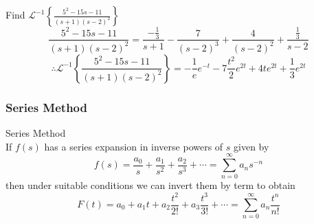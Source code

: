 \documentclass[12pt]{article}
\newcommand{\Lapinv}{\mathscr{L}^{-1}}
\begin{document}
\begin{example}{Find $\displaystyle \Lapinv \left\{ \frac{5^2 - 15s - 11}{(s+1)(s-2)^2} \right\}$}{}
    \[
        \frac{5^2 - 15s - 11}{(s+1)(s-2)^2} = \frac{-\frac{1}{3}}{s+1} - \frac{7}{(s-2)^3} + \frac{4}{(s-2)^2} + \frac{\frac{1}{3}}{s-2}
    \] \[
        \therefore \Lapinv \left\{ \frac{5^2 - 15s - 11}{(s+1)(s-2)^2} \right\} = -\frac{1}{e}e^{-t} - 7 \frac{t^2}{2} e^{2t} + 4te^{2t} + \frac{1}{3}e^{2t}
    \]
\end{example}

\subsubsection{Series Method}

\begin{theorem}{Series Method}{}
    \\If $f(s)$ has a series expansion in inverse powers of $s$ given by \[
        f(s) = \frac{a_0}{s} + \frac{a_1}{s^2} + \frac{a_2}{s^3} + \cdots = \sum_{n=0}^{\infty} {a_n s^{-n}}
    \] then under suitable conditions we can invert them by term to obtain \[
        F(t) = a_0 + a_1t + a_2\frac{t^2}{2!} + a_3\frac{t^3}{3!} + \cdots = \sum_{n=0}^{\infty} {a_n \frac{t^n}{n!}}
    \]
\end{theorem}
\end{document}

